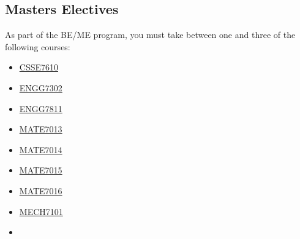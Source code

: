 \hypertarget{MASTERS}{\subsection{Masters Electives}}
As part of the BE/ME program, you must take between one and three of the following courses:
\begin{multicols}{3}
    \begin{itemize}
        \item \hyperlink{CSSE7610}{CSSE7610}
        \item \hyperlink{ENGG7302}{ENGG7302}
        \item \hyperlink{ENGG7811}{ENGG7811}
        \item \hyperlink{MATE7013}{MATE7013}
        \item \hyperlink{MATE7014}{MATE7014}
        \item \hyperlink{MATE7015}{MATE7015}
        \item \hyperlink{MATE7016}{MATE7016}
        \item \hyperlink{MECH7101}{MECH7101}
        \item[]
    \end{itemize}
\end{multicols}
